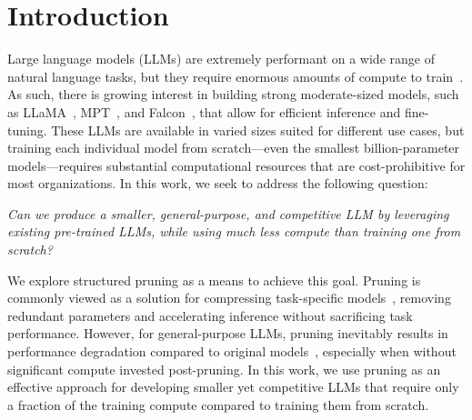 
\section{Introduction}

Large language models (LLMs) are extremely performant on a wide range of natural language tasks, but they require enormous amounts of compute to train~\citep{openai2023gpt4tr, anthropicclaudeblog}.
As such, there is growing interest in building strong moderate-sized models, such as LLaMA~\citep{touvron2023llama,touvron2023llama2}, MPT~\citep{MosaicML2023Introducing}, and Falcon~\citep{falcon40b}, that allow for efficient inference and fine-tuning.
These LLMs are available in varied sizes suited for different use cases, but training each individual model from scratch---even the smallest billion-parameter models---requires substantial computational resources that are cost-prohibitive for most organizations. 
In this work, we seek to address the following question: 
\begin{center}
\vspace{-5pt}
    \emph{Can we produce a smaller, general-purpose, and competitive LLM by leveraging existing pre-trained LLMs, while using much less compute than training one from scratch?}
\vspace{-5pt}
\end{center}

We explore structured pruning as a means to achieve this goal. Pruning is commonly viewed as a solution for  compressing task-specific models~\citep{han2016deep,li2016pruning,lagunas2021block, xia-etal-2022-structured,kurtic2023ziplm}, removing redundant parameters and accelerating inference without sacrificing task performance. 
However, 
for general-purpose LLMs,
pruning inevitably results in performance degradation compared to original models~\citep{frantar2023sparsegpt,sun2023simple,ma2023llm}, especially when without significant compute invested post-pruning. In this work, we use pruning as an effective approach for developing smaller yet competitive LLMs that require only a fraction of the training compute compared to training them from scratch. 


